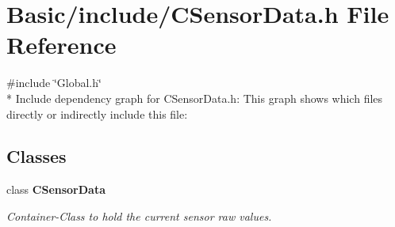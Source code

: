 \section{Basic/include/\-C\-Sensor\-Data.h File Reference}
\label{CSensorData_8h}
{\ttfamily \#include \char`\"{}Global.\-h\char`\"{}}\\*
Include dependency graph for C\-Sensor\-Data.\-h\-:
This graph shows which files directly or indirectly include this file\-:
\subsection*{Classes}
\begin{DoxyCompactItemize}
\item 
class {\bf C\-Sensor\-Data}
\begin{DoxyCompactList}\small\item\em Container-\/\-Class to hold the current sensor raw values. \end{DoxyCompactList}\end{DoxyCompactItemize}

